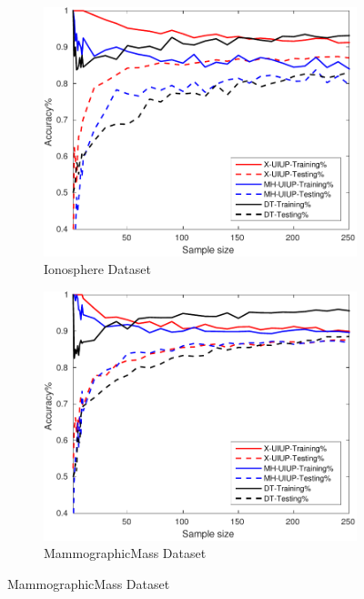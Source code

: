 \begin{figure}[ht]
\begin{subfigure}[b]{0.3\textwidth}
		\label{fig:G1}
	\end{subfigure}
  \begin{subfigure}[b]{0.3\textwidth}
		\centering
  	\includegraphics[width=\textwidth]{figs/PLPTF/Trees/IonosphereDownsampledFurther_Trees_X_MH.pdf}
  	\caption{Ionosphere Dataset}
		\label{fig:I1}
	\end{subfigure}
  \begin{subfigure}[b]{0.3\textwidth}
		\centering
  	\includegraphics[width=\textwidth]{figs/PLPTF/Trees/MammographicMassDownsampled_Trees_X_MH.pdf}
  	\caption{MammographicMass Dataset}
		\label{fig:Mam1}
	\end{subfigure}

\end{figure}
